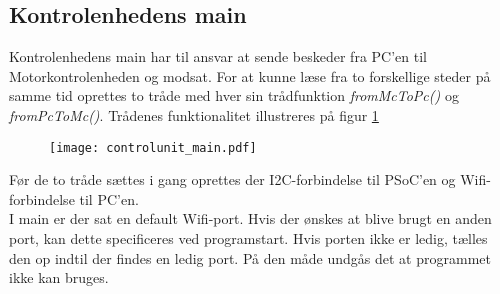 \subsection{Kontrolenhedens main}
Kontrolenhedens main har til ansvar at sende beskeder fra PC’en til Motorkontrolenheden og modsat.
For at kunne læse fra to forskellige steder på samme tid oprettes to tråde med hver sin trådfunktion \textit{fromMcToPc()} og \textit{fromPcToMc()}.
Trådenes funktionalitet illustreres på figur \ref{fig:controlunit_main}

\begin{figure} [H]
\centering
	\texttt{[image: controlunit\_main.pdf]}
	\label{fig:controlunit_main}
\end{figure}

Før de to tråde sættes i gang oprettes der I2C-forbindelse til PSoC'en og Wifi-forbindelse til PC'en.\\
I main er der sat en default Wifi-port.
Hvis der ønskes at blive brugt en anden port, kan dette specificeres ved programstart. 
Hvis porten ikke er ledig, tælles den op indtil der findes en ledig port. 
På den måde undgås det at programmet ikke kan bruges.